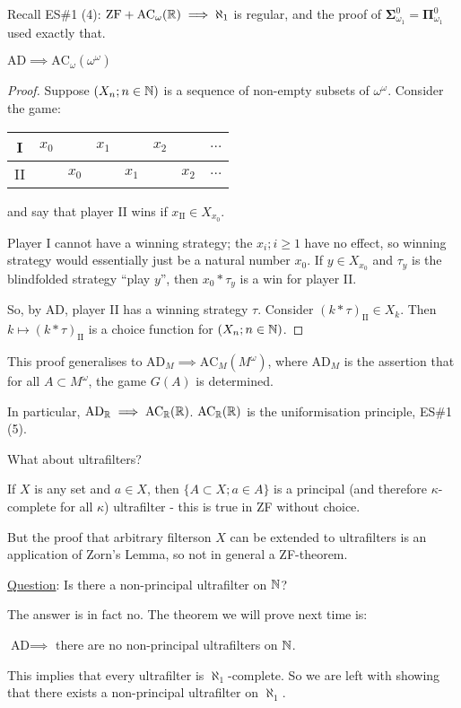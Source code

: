 \documentclass[]{article}
\newcommand{\II}{\textrm{II}}
\newcommand{\om}{\omega}
\renewcommand{\ac}{\textrm{AC}}
\newcommand{\bosig}{\bm{\Sigma}}
\newcommand{\bopi}{\bm{\Pi}}
\newcommand{\ad}{\textrm{AD}}
\newcommand{\zf}{\textrm{ZF}}
\newcommand{\gamec}[2]{
    \begin{center}
        \begin{tabular}{c|ccccccc}
            I & $#1_0$ & & $#1_1$ & & $#1_2 $& & $\dots $\\ \hline
            II & & $#2_0$ & & $#2_1 $& &$ #2_2$ & $\dots$ 
        \end{tabular}
    \end{center}
}
\begin{document}
Recall ES\#1 (4): $\zf + \ac_\om(\R)\implies \aleph_1$ is regular, and the proof of $\bosig^0_{\om_1} = \bopi^0_{\om_1}$ used exactly that.

\begin{remark*}[Proposition]
    \emph{
        $\ad\implies\ac_\om(\om^\om)$
    }
\end{remark*}
\begin{proof}
    Suppose $(X_n;n\in\mathbb{N})$ is a sequence of non-empty subsets of $\om^\om$. Consider the game:
    \gamec{x}{x}
    and say that player II wins if $x_\II\in X_{x_0}$.

    Player I cannot have a winning strategy; the $x_i;i\ge 1$ have no effect, so winning strategy would essentially just be a natural number $x_0$. If $y \in X_{x_0}$ and $\tau_y$ is the blindfolded strategy ``play $y$'', then $x_0 \ast \tau_y$ is a win for player II.

    So, by AD, player II has a winning strategy $\tau$. Consider $(k\ast \tau)_\II\in X_k$. Then $k\mapsto (k\ast\tau)_\II$ is a choice function for $(X_n;n\in\mathbb{N})$.
\end{proof}
\begin{remark*}
    This proof generalises to $\ad_M \implies \ac_M(M^\om)$, where $\ad_M$ is the assertion that for all $A \subset M^\om$, the game $G(A)$ is determined.

    In particular, $\ad_\R \implies \ac_\R(\R)$. $\ac_\R(\R)$ is the uniformisation principle, ES\#1 (5).
\end{remark*}

\begin{remark*}
    What about ultrafilters?

    If $X$ is any set and $a \in X$, then $\{A\subset X;a \in A\}$ is a principal (and therefore $\kappa$-complete for all $\kappa$) ultrafilter - this is true in ZF without choice.

    But the proof that arbitrary filterson $X$ can be extended to ultrafilters is an application of Zorn's Lemma, so not in general a ZF-theorem.

    \underline{Question}: Is there a non-principal ultrafilter on $\mathbb{N}$?

    The answer is in fact no. The theorem we will prove next time is:

    \begin{theorem*}
        $\ad\implies$ there are no non-principal ultrafilters on $\mathbb{N}$.
    \end{theorem*}

    This implies that every ultrafilter is $\aleph_1$-complete. So we are left with showing that there exists a non-principal ultrafilter on $\aleph_1$.
\end{remark*}
\end{document}
